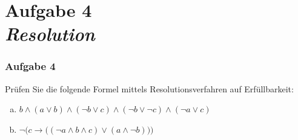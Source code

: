 \documentclass{beamer}
\begin{document}
	
	\section{Aufgabe 4 \\ \itshape Resolution}
	
	\begin{frame} \frametitle{Aufgabe 4}
		\small
		Prüfen Sie die folgende Formel mittels Resolutionsverfahren auf Erfüllbarkeit:
		\begin{enumerate}[a)]
			\item $b \land (a \lor b) \land (\lnot b \lor c) \land (\lnot b \lor \lnot c) \land (\lnot a \lor c)$
			\item $\lnot \Big( c \to \big( (\lnot a \land b \land c) \lor (a \land \lnot b) \big) \Big)$
		\end{enumerate}
	\end{frame}
	
	
\end{document}
